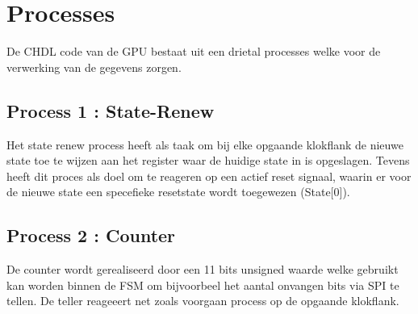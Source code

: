 \documentclass[oneside,dutch]{tudelft-report}
\begin{document}
\section{Processes}
De CHDL code van de GPU bestaat uit een drietal processes welke voor de verwerking van de gegevens zorgen.
\subsection{Process 1 : State-Renew}
Het state renew process heeft als taak om bij elke opgaande klokflank de nieuwe state toe te wijzen aan het register waar de huidige state in is opgeslagen. Tevens heeft dit proces als doel om te reageren op een actief reset signaal, waarin er voor de nieuwe state een specefieke resetstate wordt toegewezen (State[0]).
\subsection{Process 2 : Counter}
De counter wordt gerealiseerd door een 11 bits unsigned waarde welke gebruikt kan worden binnen de FSM om bijvoorbeel het aantal onvangen bits via SPI te tellen. De teller reageeert net zoals voorgaan process op de opgaande klokflank.
\end{document}
